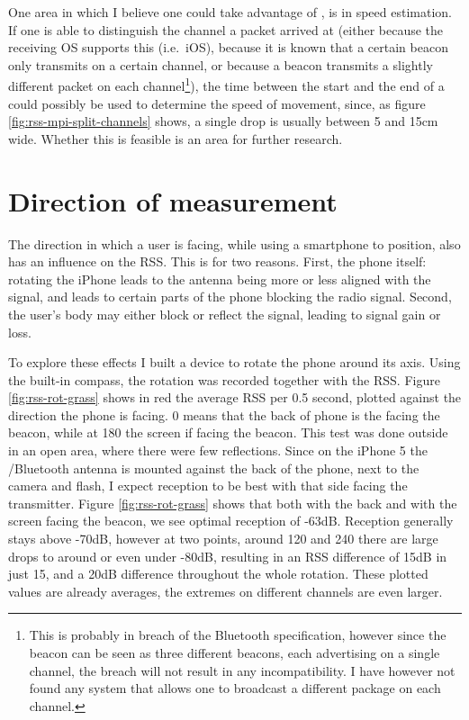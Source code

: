 One area in which I believe one could take advantage of \mpi, is in speed estimation.
If one is able to distinguish the channel a packet arrived at (either because the receiving OS supports this (i.e.\ iOS), because it is known that a certain beacon only transmits on a certain channel, or because a beacon transmits a slightly different packet on each channel\footnote{This is probably in breach of the Bluetooth specification, however since the beacon can be seen as three different beacons, each advertising on a single channel, the breach will not result in any incompatibility. I have however not found any system that allows one to broadcast a different package on each channel.}), the time between the start and the end of a \mpid could possibly be used to determine the speed of movement, since, as figure \ref{fig:rss-mpi-split-channels} shows, a single drop is usually between 5 and 15cm wide.
Whether this is feasible is an area for further research.

\section{Direction of measurement}
\label{sec:rss-rot}

The direction in which a user is facing, while using a smartphone to position, also has an influence on the RSS.
This is for two reasons.
First, the phone itself: rotating the iPhone leads to the antenna being more or less aligned with the signal, and leads to certain parts of the phone blocking the radio signal.
Second, the user's body may either block or reflect the signal, leading to signal gain or loss.


To explore these effects I built a device to rotate the phone around its axis.
Using the built-in compass, the rotation was recorded together with the RSS.
Figure \ref{fig:rss-rot-grass} shows in red the average RSS per 0.5 second, plotted against the direction the phone is facing.
0\textdegree{} means that the back of phone is the facing the beacon, while at 180\textdegree{} the screen if facing the beacon.
This test was done outside in an open area, where there were few reflections.
Since on the iPhone 5 the \wifi/Bluetooth antenna is mounted against the back of the phone, next to the camera and flash, I expect reception to be best with that side facing the transmitter.
Figure \ref{fig:rss-rot-grass} shows that both with the back and with the screen facing the beacon, we see optimal reception of -63dB.
Reception generally stays above -70dB, however at two points, around 120\textdegree{} and 240\textdegree{} there are large drops to around or even under -80dB, resulting in an RSS difference of 15dB in just 15\textdegree{}, and a 20dB difference throughout the whole rotation.
These plotted values are already averages, the extremes on different channels are even larger.

